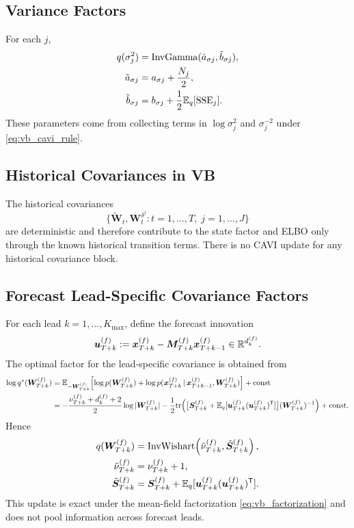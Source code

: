 \subsection{Variance Factors}
For each $j$,
\begin{align}
q(\sigma_j^2) &= \mathrm{InvGamma}(\tilde a_{\sigma j},\tilde b_{\sigma j}), \\
\tilde a_{\sigma j} &= a_{\sigma j}+\frac{N_j}{2}, \\
\tilde b_{\sigma j} &= b_{\sigma j}+\frac{1}{2}\mathbb{E}_q[\mathrm{SSE}_j].
\label{eq:vb_sigma}
\end{align}
These parameters come from collecting terms in
$\log \sigma_j^2$ and $\sigma_j^{-2}$ under \eqref{eq:vb_cavi_rule}.

\subsection{Historical Covariances in VB}
The historical covariances
\[
\{\tilde{\bm W}_t,\bm W_t^{\delta^j}\colon t=1,\dots,T,\; j=1,\dots,J\}
\]
are deterministic and therefore contribute to the state factor and ELBO only through the known
historical transition terms. There is no CAVI update for any historical covariance block.

\subsection{Forecast Lead-Specific Covariance Factors}
For each lead $k=1,\dots,K_{\max}$, define the forecast innovation
\begin{align}
\bm u_{T+k}^{(f)}:=\bm x_{T+k}^{(f)}-\bm M_{T+k}^{(f)}\bm x_{T+k-1}^{(f)}
\in\mathbb{R}^{d_k^{(f)}}.
\end{align}
The optimal factor for the lead-specific covariance is obtained from
\begin{align}
\log q^\star(\bm W_{T+k}^{(f)})
&=
\mathbb{E}_{-\bm W_{T+k}^{(f)}}\!\left[
\log p(\bm W_{T+k}^{(f)})
+\log p(\bm x_{T+k}^{(f)}\,|\,\bm x_{T+k-1}^{(f)},\bm W_{T+k}^{(f)})
\right]
+\text{const} \nonumber\\
&=
-\frac{\nu_{T+k}^{(f)}+d_k^{(f)}+2}{2}\log|\bm W_{T+k}^{(f)}|
-\frac12\mathrm{tr}\!\left(
\big[\bm S_{T+k}^{(f)}+\mathbb{E}_q[\bm u_{T+k}^{(f)}(\bm u_{T+k}^{(f)})^{\mathsf{T}}]\big]
(\bm W_{T+k}^{(f)})^{-1}
\right)
+\text{const}.
\end{align}
Hence
\begin{align}
q(\bm W_{T+k}^{(f)})
&= \mathrm{InvWishart}\!\left(
\tilde\nu_{T+k}^{(f)},
\tilde{\bm S}_{T+k}^{(f)}
\right), \\
\tilde\nu_{T+k}^{(f)}
&= \nu_{T+k}^{(f)} + 1, \\
\tilde{\bm S}_{T+k}^{(f)}
&= \bm S_{T+k}^{(f)} + \mathbb{E}_q[\bm u_{T+k}^{(f)}(\bm u_{T+k}^{(f)})^{\mathsf{T}}].
\label{eq:vb_W_fcast}
\end{align}
This update is exact under the mean-field factorization \eqref{eq:vb_factorization} and
does not pool information across forecast leads.


